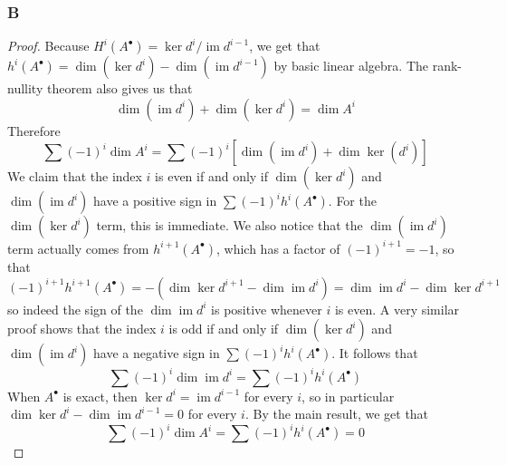 \documentclass{article}
\DeclareMathOperator{\im}{\mathrm{im}}
\begin{document}
\subsubsection{B}\label{1.6.B}
\begin{proof}
    Because $H^i(A^\bullet)=\ker d^i/\im d^{i-1}$, we get that $h^i(A^\bullet)=\dim(\ker d^i)-\dim (\im d^{i-1})$ by basic linear algebra. The rank-nullity theorem also gives us that
    \[
    \dim(\im d^i)+\dim(\ker d^i)=\dim A^i
    \]
    Therefore
    \[
    \sum (-1)^i \dim A^i=\sum (-1)^i [\dim(\im d^i)+\dim \ker(d^i)]
    \]
   We claim that the index $i$ is even if and only if $\dim(\ker d^i)$ and $\dim(\im d^i)$ have a positive sign in $\sum (-1)^i h^i(A^\bullet)$. For the $\dim(\ker d^i)$ term, this is immediate. We also notice that the $\dim(\im d^i)$ term actually comes from $h^{i+1}(A^\bullet)$, which has a factor of $(-1)^{i+1}=-1$, so that 
   \[
   (-1)^{i+1} h^{i+1}(A^\bullet)=-(\dim \ker d^{i+1}- \dim \im d^i)=\dim \im d^i-\dim \ker d^{i+1}
   \]
   so indeed the sign of the $\dim \im d^i$ is positive whenever $i$ is even. A very similar proof shows that the index $i$ is odd if and only if $\dim(\ker d^i)$ and $\dim(\im d^i)$ have a negative sign in $\sum (-1)^i h^i(A^\bullet)$. It follows that
   \[
   \sum (-1)^i \dim \im d^i=\sum (-1)^i h^i(A^\bullet)
   \]
   When $A^\bullet$ is exact, then $\ker d^i=\im d^{i-1}$ for every $i$, so in particular $\dim \ker d^i-\dim \im d^{i-1}=0$ for every $i$. By the main result, we get that
   \[
   \sum (-1)^i \dim A^i=\sum (-1)^i h^i(A^\bullet)=0
   \]
\end{proof}
\end{document}
